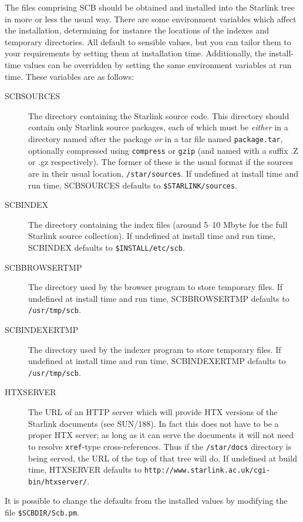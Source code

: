 \documentclass[twoside,11pt]{article}
\newcommand{\xref}[3]{#1}
\renewcommand{\_}{\texttt{\symbol{95}}}
\begin{document}
The files comprising SCB should be obtained and installed into
the Starlink tree in more or less the usual way.
There are some environment variables which affect the
installation, determining for instance the locations of the
indexes and temporary directories.
All default to sensible values, but
you can tailor them to your requirements by setting them at
installation time.
Additionally, the install-time values can be overridden by
setting the same environment variables at run time.
These variables are as follows:
\begin{description}
\item[SCB\_SOURCES]
The directory containing the Starlink source code.
This directory should contain only Starlink source packages,
each of which must be {\em either\/} in a directory named after the package
{\em or\/} in a tar file named {\tt package.tar}, optionally compressed
using {\tt compress} or {\tt gzip} (and named with a suffix .Z or .gz
respectively).
The former of these is the usual format if the sources are in
their usual location, {\tt /star/sources}.
If undefined at install time and run time, SCB\_SOURCES
defaults to {\tt \$STARLINK/sources}.
\item[SCB\_INDEX]
The directory containing the index files (around 5--10 Mbyte for the full
Starlink source collection).
If undefined at install time and run time, SCB\_INDEX defaults to
{\tt \$INSTALL/etc/scb}.
\item[SCB\_BROWSER\_TMP]
The directory used by the browser program to store temporary files.
If undefined at install time and run time, SCB\_BROWSER\_TMP defaults to
{\tt /usr/tmp/scb}.
\item[SCB\_INDEXER\_TMP]
The directory used by the indexer program to store temporary files.
If undefined at install time and run time, SCB\_INDEXER\_TMP defaults to
{\tt /usr/tmp/scb}.
\item[HTX\_SERVER]
The URL of an HTTP server which will provide HTX versions of the Starlink
documents (see \xref{SUN/188}{sun188}{remote_document_servers}).
In fact this does not have to be a proper HTX server; as long as it
can serve the documents it will not need to resolve {\tt xref\_}-type
cross-references.
Thus if the {\tt /star/docs} directory is being served, the URL of
the top of that tree will do.
If undefined at build time, HTX\_SERVER defaults to
{\tt http://www.starlink.ac.uk/cgi-bin/htxserver/}.
\end{description}
It is possible to change the defaults from the installed values by
modifying the file {\tt \$SCB\_DIR/Scb.pm}.
\end{document}
